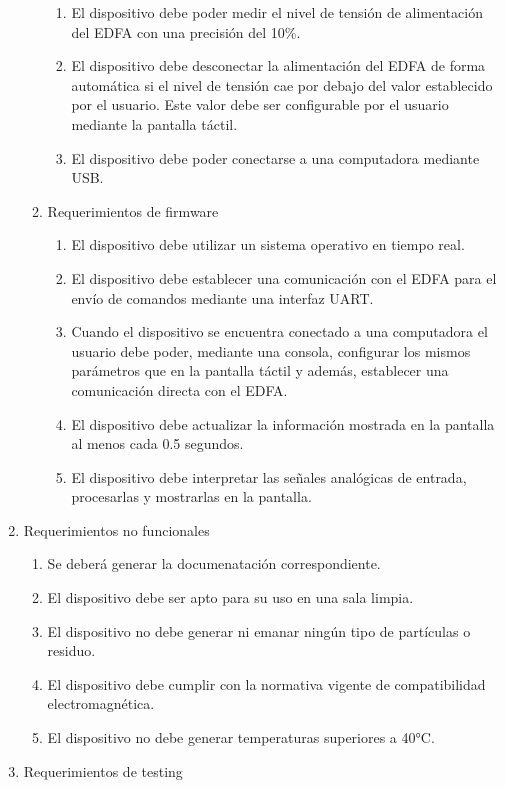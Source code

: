 \documentclass[
11pt, %
codirector, %
]{charter}
\begin{document}
\begin{enumerate}
\begin{enumerate}
\begin{enumerate}[label*=\arabic*.]
					\item El dispositivo debe poder medir el nivel de tensión de alimentación del EDFA con una precisión del 10\%.
					\item El dispositivo debe desconectar la alimentación del EDFA de forma automática si el nivel de tensión cae por debajo del valor establecido por el usuario. Este valor debe ser configurable por el usuario mediante la pantalla táctil.
					\item El dispositivo debe poder conectarse a una computadora mediante USB.
				\end{enumerate}
			\item Requerimientos de firmware
				\begin{enumerate}[label*=\arabic*.]
					\item El dispositivo debe utilizar un sistema operativo en tiempo real.
					\item El dispositivo debe establecer una comunicación con el EDFA para el envío de comandos mediante una interfaz UART.
					\item Cuando el dispositivo se encuentra conectado a una computadora el usuario debe poder, mediante una consola, configurar los mismos parámetros que en la pantalla táctil y además, establecer una comunicación directa con el EDFA.
					\item El dispositivo debe actualizar la información mostrada en la pantalla al menos cada 0.5 segundos.
					\item El dispositivo debe interpretar las señales analógicas de entrada, procesarlas y mostrarlas en la pantalla.
				\end{enumerate}
		\end{enumerate}
	\item Requerimientos no funcionales
		\begin{enumerate}
			\item Se deberá generar la documenatación correspondiente.
			\item El dispositivo debe ser apto para su uso en una sala limpia.
			\item El dispositivo no debe generar ni emanar ningún tipo de partículas o residuo.
			\item El dispositivo debe cumplir con la normativa vigente de compatibilidad electromagnética.
			\item El dispositivo no debe generar temperaturas superiores a 40°C.
		\end{enumerate}
	\item Requerimientos de testing

\end{enumerate}
\end{document}
